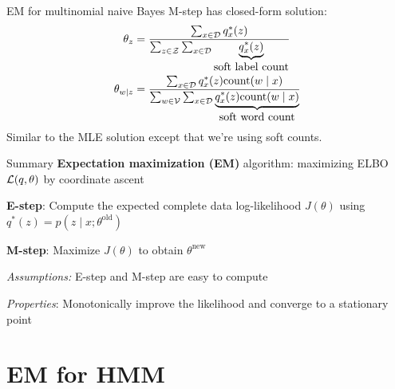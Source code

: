 \documentclass[usenames,dvipsnames,notes,11pt,aspectratio=169]{beamer}
\begin{document}
\begin{frame}
    {EM for multinomial naive Bayes}
    M-step has closed-form solution:
    \begin{align*}
        \theta_z &= \frac{\sum_{x\in\mathcal{D}} q^*_x(z)}
        {\sum_{z\in\mathcal{Z}} \sum_{x\in\mathcal{D}}\underbrace{q^*_x(z)}_{\textstyle\text{soft label count}}}\\
        \theta_{w\mid z} &= \frac{
            \sum_{x\in\mathcal{D}} q^*_x(z)\text{count}(w\mid x)  
        }{
            \sum_{w\in\mathcal{V}}\sum_{x\in\mathcal{D}} \underbrace{q^*_x(z)\text{count}(w\mid x)}_{\textstyle\text{soft word count}
        }}
    \end{align*}
    Similar to the MLE solution except that we're using soft counts.
\end{frame}


\begin{frame}
    {Summary}
    \textbf{Expectation maximization (EM)} algorithm:
    maximizing ELBO $\mathcal{L}(q, \theta)$ by coordinate ascent

    \textbf{E-step}:
    Compute the expected complete data log-likelihood $J(\theta)$
    using
    $q^*(z) = p(z\mid x; \theta^{\text{old}})$

    \textbf{M-step}:
        Maximize $J(\theta)$ to obtain $\theta^{\text{new}}$
        
    \emph{Assumptions:}
    E-step and M-step are easy to compute

    \emph{Properties}:
        Monotonically improve the likelihood and converge to a stationary point
\end{frame}

\section{EM for HMM}
\end{document}
